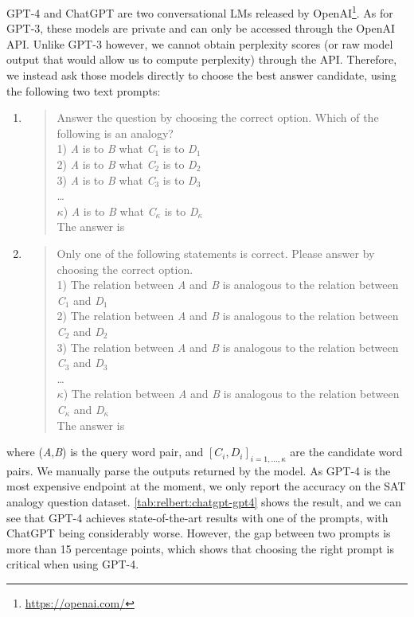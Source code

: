 \documentclass[3p]{elsarticle}
\begin{document}
{GPT-4 and ChatGPT are two conversational LMs released by OpenAI\footnote{\url{https://openai.com/}}. As for GPT-3, these models are private and can only be accessed through the OpenAI API. Unlike GPT-3 however, we cannot obtain perplexity scores ({or raw model output that would allow us to} compute perplexity) through the API. Therefore, we instead ask those models directly to choose the best answer candidate, using the following two text prompts: 
\begin{enumerate}
\item 
\begin{quote}
Answer the question by choosing the correct option. Which of the following is an analogy? \\
1) \textit{A} is to \textit{B} what \textit{C}$_1$ is to \textit{D}$_1$ \\
2) \textit{A} is to \textit{B} what \textit{C}$_2$ is to \textit{D}$_2$ \\
3) \textit{A} is to \textit{B} what \textit{C}$_3$ is to \textit{D}$_3$ \\
\dots \\
$\kappa$) \textit{A} is to \textit{B} what \textit{C}$_{\kappa}$ is to \textit{D}$_{\kappa}$ \\
The answer is
\end{quote}
\item 
\begin{quote}
Only one of the following statements is correct. Please answer by choosing the correct option. \\
1) The relation between \textit{A} and \textit{B} is analogous to the relation between \textit{C}$_1$ and \textit{D}$_1$ \\
2) The relation between \textit{A} and \textit{B} is analogous to the relation between \textit{C}$_2$ and \textit{D}$_2$ \\
3) The relation between \textit{A} and \textit{B} is analogous to the relation between \textit{C}$_3$ and \textit{D}$_3$ \\
\dots \\
${\kappa}$) The relation between \textit{A} and \textit{B} is analogous to the relation between \textit{C}$_{\kappa}$ and \textit{D}$_{\kappa}$ \\
The answer is
\end{quote}
\end{enumerate}
where (\textit{A},\textit{B}) is the query word pair, and $[C_i, D_i]_{i=1,\dots,\kappa}$ are the candidate word pairs. We manually parse the outputs returned by the model. As GPT-4 is the most expensive endpoint at the moment, we only report the accuracy on the SAT analogy question dataset. \autoref{tab:relbert:chatgpt-gpt4} shows the result, and we can see that GPT-4 achieves state-of-the-art results with one of the prompts, with ChatGPT being considerably worse. However, the gap between two prompts is more than 15 percentage points, which shows that choosing the right prompt is critical when using GPT-4.

}
\end{document}
